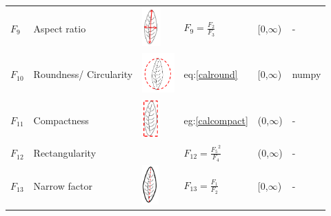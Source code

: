 \documentclass{article}
\begin{document}
\begin{longtable}{llllll}
$F_{9}$                     & Aspect ratio                                                                                &     \centering\includegraphics[width=\linewidth, height=15mm]{./Figures/AR.png}                       &       $F_9 = \frac{F_2}{F_3}$                      &       [0,$\infty$)                    &                                -                               \\
$F_{10}$                     & Roundness/ Circularity                                                                      &       \centering\includegraphics[width=\linewidth, height=15mm]{./Figures/roudness.png}                       &           eq:\ref{calround}                  &          [0,$\infty$)                &     numpy                                                          \\
$F_{11}$                     & Compactness                                                                                 &     \centering\includegraphics[width=\linewidth, height=15mm]{./Figures/rect.png}                       &        eg:\ref{calcompact}                     &     (0,$\infty$)                      &                   -                                            \\
$F_{12}$                     & Rectangularity                                                                              &                            &       $F_{12} = \frac{{F_5}^2}{F_4}$                      &      (0,$\infty$)                     &               -                                                \\
$F_{13}$                     & Narrow factor                                                                               &       \centering\includegraphics[width=\linewidth, height=15mm]{./Figures/nf.png}                     &         $F_{13} = \frac{F_1}{F_2}$                    &     [0,$\infty$)                      &                     -                                          \\

\end{longtable}
\end{document}
